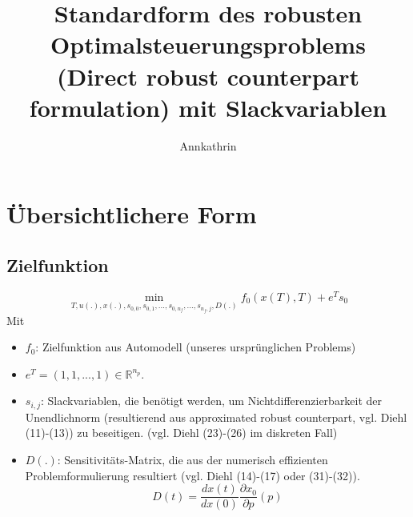 \documentclass[12pt,a4paper]{article}
\theoremstyle{definition}
\theoremstyle{plain}
\begin{document}
\title{Standardform des robusten Optimalsteuerungsproblems (Direct robust counterpart formulation) mit Slackvariablen}
\author{Annkathrin}
\maketitle

\tableofcontents

\section{Übersichtlichere Form}

\subsection*{Zielfunktion}
\begin{equation}
\min_{T, u(.), x(.), s_{0,0}, s_{0,1},..., s_{0, n_{f}},..., s_{n_{f},j}, D(.)} f_{0}(x(T), T)+e^{T}s_{0}
\end{equation}
Mit
\begin{itemize}
\item $f_{0}$: Zielfunktion aus Automodell (unseres ursprünglichen Problems)
	
\item $e^{T}=(1,1,...,1)\in\mathbb{R}^{n_{p}}$.

\item $s_{i,j}$: Slackvariablen, die benötigt werden, um Nichtdifferenzierbarkeit der Unendlichnorm (resultierend aus approximated robust counterpart, vgl. Diehl (11)-(13)) zu beseitigen. (vgl. Diehl (23)-(26) im diskreten Fall)

\item $D(.)$: Sensitivitäts-Matrix, die aus der numerisch effizienten Problemformulierung resultiert (vgl. Diehl (14)-(17) oder (31)-(32)).
\begin{equation*}
D(t)=\frac{dx(t)}{dx(0)}\frac{\partial x_{0}}{\partial p}(p)
\end{equation*}

\end{itemize}
\end{document}
